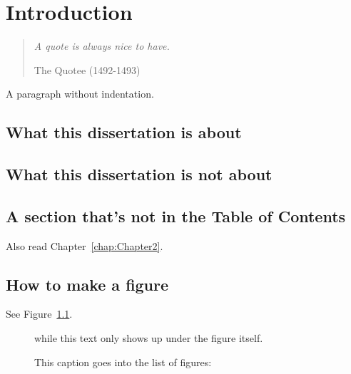 %
%

\chapter{Introduction}


\begin{quote}

{\em A quote is always nice to have.}

 The Quotee (1492-1493)

\end{quote}


\noindent
A paragraph without indentation.



\section{What this dissertation is about}

\section{What this dissertation is not about}



\pagebreak
\section*{A section that's not in the Table of Contents}

Also read Chapter~\ref{chap:Chapter2}.


\section{How to make a figure}

See Figure~\ref{fig:figure_reference}.

\begin{figure}[htb]
\figsp
\begin{center}
\end{center}
\caption{This caption goes into the list of figures:}
while this text only shows up under the figure itself.
\label{fig:figure_reference}
\end{figure}


